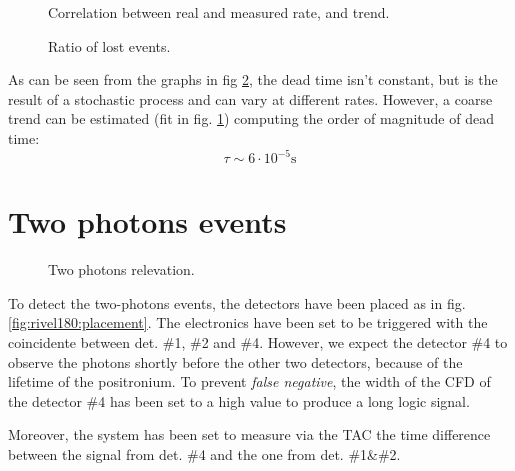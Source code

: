 \documentclass[11pt,a4 paper]{article}
\begin{document}
\begin{figure}[H]
  \centering
  \caption{Correlation between real and measured rate, and trend.}
  \label{fig:deadtime:fit}
\end{figure}

\begin{figure}[H]
  \centering
  \caption{Ratio of lost events.}
  \label{fig:deadtime}
\end{figure}

As can be seen from the graphs in fig \ref{fig:deadtime}, the dead time isn't constant, but is the result of a stochastic process and can vary at different rates. However, a coarse trend can be estimated (fit in fig. \ref{fig:deadtime:fit}) computing the order of magnitude of dead time:
\begin{equation*}
    \tau \sim 6\cdot10^{-5} \si{\second}
\end{equation*}



\section{Two photons events}

\begin{figure}[H]
    \centering
    { \label{fig:rivel180:placement}} \quad
    {}
    \caption{Two photons relevation.}
    \label{fig:rivel180}
\end{figure}

To detect the two-photons events, the detectors have been placed as in fig. \ref{fig:rivel180:placement}. The electronics have been set to be triggered with the coincidente between det. \#1, \#2 and \#4. However, we expect the detector \#4 to observe the photons shortly before the other two detectors, because of the lifetime of the positronium. To prevent \emph{false negative}, the width of the CFD of the detector \#4 has been set to a high value to produce a long logic signal.

Moreover, the system has been set to measure via the TAC the time difference between the signal from det. \#4 and the one from det. \#1\&\#2.
\end{document}
